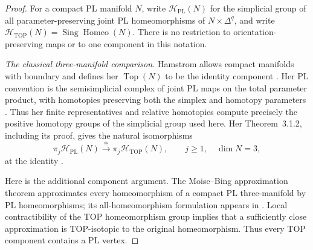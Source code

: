 \begin{proof}
For a compact PL manifold $N$, write $\mathcal H_{\mathrm{PL}}(N)$
for the simplicial group of all parameter-preserving joint PL
homeomorphisms of $N\times\Delta^q$, and write
$\mathcal H_{\mathrm{TOP}}(N)=\operatorname{Sing}\operatorname{Homeo}(N)$.
There is no restriction to orientation-preserving maps or to one
component in this notation.

\medskip\noindent\textit{The classical three-manifold comparison.}
Hamstrom allows compact manifolds with boundary and defines her
$\operatorname{Top}(N)$ to be the identity component
\cite[\S0.2, p.~208]{Hamstrom1974}.  Her PL convention is the
semisimplicial complex of joint PL maps on the total parameter
product, with homotopies preserving both the simplex and homotopy
parameters \cite[\S2.1, p.~222]{Hamstrom1974}.  Thus her finite
representatives and relative homotopies compute precisely the
positive homotopy groups of the simplicial group used here.  Her
Theorem~3.1.2, including its proof, gives the natural isomorphisms
\[
 \pi_j\mathcal H_{\mathrm{PL}}(N)
   \xrightarrow{\ \cong\ }
 \pi_j\mathcal H_{\mathrm{TOP}}(N),\qquad j\geq1,\quad\dim N=3,
\]
at the identity \cite[pp.~225--226]{Hamstrom1974}.

Here is the additional component argument.  The Moise--Bing
approximation theorem approximates every homeomorphism of a compact
PL three-manifold by PL homeomorphisms; its all-homeomorphism
formulation appears in
\cite[Chapter~I, \S1, Theorem~1.1, p.~7]{Laudenbach1974}.
Local contractibility of the TOP homeomorphism group
\cite[Corollary~1.1]{EdwardsKirby1971} implies that a sufficiently
close approximation is TOP-isotopic to the original homeomorphism.
Thus every TOP component contains a PL vertex.


\end{proof}
